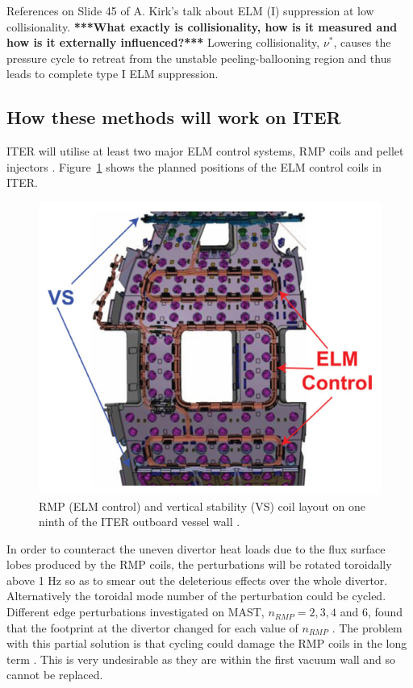 \documentclass[12pt]{article}  %
\begin{document}
References on Slide 45 of A. Kirk's talk about ELM (I) suppression at low collisionality. \textbf{***What exactly is collisionality, how is it measured and how is it externally influenced?***} Lowering collisionality, $\nu^{*}$, causes the pressure cycle to retreat from the unstable peeling-ballooning region and thus leads to complete type I ELM suppression.\cite{Evans2008}


\subsection{How these methods will work on ITER}\label{ssec:onITER}
ITER will utilise at least two major ELM control systems, RMP coils and pellet injectors \cite{Loarte2010}. Figure~\ref{fig:ITERcoils} shows the planned positions of the ELM control coils in ITER.

\begin{figure}
\includegraphics[scale=0.5]{Figures/ITERcoils.png}
\centering
\caption{RMP (ELM control) and vertical stability (VS) coil layout on one ninth of the ITER outboard vessel wall \cite{Lang2013}.}\label{fig:ITERcoils}
\end{figure}

In order to counteract the uneven divertor heat loads due to the flux surface lobes produced by the RMP coils, the perturbations will be rotated toroidally above 1 Hz \cite{LoarteTR2013} so as to smear out the deleterious effects over the whole divertor. Alternatively the toroidal mode number of the perturbation could be cycled. Different edge perturbations investigated on MAST, $n_{RMP}=2,3,4$ and $6$, found that the footprint at the divertor changed for each value of $n_{RMP}$ \cite{Chapman2014}. The problem with this partial solution is that cycling could damage the RMP coils in the long term \cite{KirkFF}. This is very undesirable as they are within the first vacuum wall and so cannot be replaced. 
\end{document}
